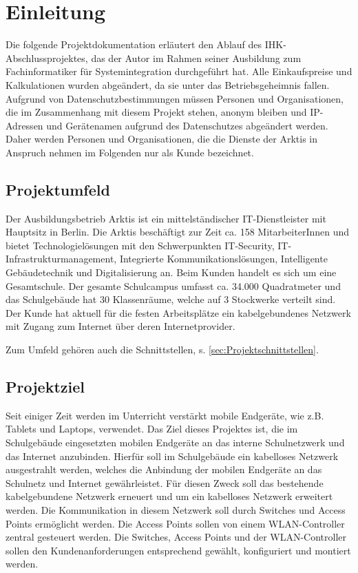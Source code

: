 \newpage
\section{Einleitung}
\label{sec:Einleitung}
Die folgende Projektdokumentation erläutert den Ablauf des IHK-Abschlussprojektes, das der Autor im Rahmen seiner Ausbildung zum Fachinformatiker für Systemintegration durchgeführt hat. 
Alle Einkaufspreise und Kalkulationen wurden abgeändert, da sie unter das Betriebsgeheimnis fallen. 
Aufgrund von Datenschutzbestimmungen müssen Personen und Organisationen, die im Zusammenhang mit diesem Projekt stehen, anonym bleiben und IP-Adressen und Gerätenamen aufgrund des Datenschutzes abgeändert werden. 
 Daher werden Personen und Organisationen, die die Dienste der \ac{Arktis} in Anspruch nehmen im Folgenden nur als Kunde bezeichnet. 

\subsection{Projektumfeld} 
\label{sec:Projektumfeld}
Der Ausbildungsbetrieb \acs{Arktis} ist ein mittelständischer IT-Dienstleister mit Hauptsitz in Berlin. Die \ac{Arktis} beschäftigt zur Zeit ca. 158 MitarbeiterInnen und bietet Technologielösungen mit den Schwerpunkten IT-Security, IT-Infrastrukturmanagement, Integrierte Kommunikationslösungen, Intelligente Gebäudetechnik und Digitalisierung an. Beim Kunden handelt es sich um eine Gesamtschule. Der gesamte Schulcampus umfasst ca. 34.000 Quadratmeter und das Schulgebäude hat 30 Klassenräume, welche auf 3 Stockwerke verteilt sind. Der Kunde hat aktuell für die festen Arbeitsplätze ein kabelgebundenes Netzwerk mit Zugang zum Internet über deren Internetprovider.   

Zum Umfeld gehören auch die Schnittstellen, s. \ref{sec:Projektschnittstellen}.

\subsection{Projektziel} 
\label{sec:Projektziel}
Seit einiger Zeit werden im Unterricht verstärkt mobile Endgeräte, wie z.B. Tablets und Laptops, verwendet. 
Das Ziel dieses Projektes ist, die im Schulgebäude eingesetzten mobilen Endgeräte an das interne Schulnetzwerk und das Internet anzubinden. 
Hierfür soll im Schulgebäude ein kabelloses Netzwerk ausgestrahlt werden, welches die Anbindung der mobilen Endgeräte an das Schulnetz und Internet gewährleistet. 
Für diesen Zweck soll das bestehende kabelgebundene Netzwerk erneuert und um ein kabelloses Netzwerk erweitert werden. 
Die Kommunikation in diesem Netzwerk soll durch Switches und Access Points ermöglicht werden. 
Die Access Points sollen von einem WLAN-Controller zentral gesteuert werden. 
Die Switches, Access Points und der WLAN-Controller sollen den Kundenanforderungen entsprechend gewählt, konfiguriert und montiert werden.


